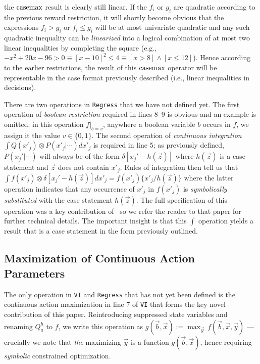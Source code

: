 the $\mathrm{casemax}$ result is clearly still linear.  If the $f_i$ or $g_i$
are quadratic according to the previous reward restriction, it will
shortly become obvious that the expressions $f_i > g_i$ or $f_i \leq
g_i$ will be at most univariate quadratic and any such quadratic
inequality can be \emph{linearized} into a logical combination of at most 
two linear inequalities by completing the square (e.g., 
$-x^2 + 20x - 96 > 0 \equiv [x - 10]^2 \leq 4 \equiv [x > 8] \land [x \leq 12]$).  Hence
according to the earlier restrictions, the result of this $\mathrm{casemax}$
operator will be representable in the case format previously described
(i.e., linear inequalities in decisions).

There are two operations in \texttt{Regress} that we have not defined
yet.  The first operation of \emph{boolean restriction} required in
lines 8--9 is obvious and an example is omitted: in this operation
$f|_{b=v}$, anywhere a boolean variable $b$ occurs in $f$, we assign
it the value $v \in \{ 0,1 \}$.  The second operation of
\emph{continuous integration} $\int Q(x'_j) \otimes P(x'_j|\cdots)
dx'_j$ is required in line 5; as previously defined, $P(x_j'|\cdots)$
will always be of the form $\delta[x_j' - h(\vec{z})]$ where
$h(\vec{z})$ is a case statement and $\vec{z}$ does not contain
$x'_j$.  Rules of integration then tell us that $\int f(x'_j) \otimes
\delta[x_j' - h(\vec{z})] dx'_j = f(x'_j) \{ x'_j / h(\vec{z}) \}$
where the latter operation indicates that any occurrence of $x'_j$ in
$f(x'_j)$ is \emph{symbolically substituted} with the case statement
$h(\vec{z})$.  The full specification of this operation was a key
contribution of~\cite{sanner_uai11} so we refer the reader to that
paper for further technical details.  The
important insight is that this $\int$ operation yields a result that is a
case statement in the form previously outlined.

\subsection{Maximization of Continuous Action Parameters}

The only operation in \texttt{VI} and \texttt{Regress} that has not
yet been defined is the continuous action maximization in line 7 of
\texttt{VI} that forms the key novel contribution of this paper.
Reintroducing suppressed state variables and renaming $Q_a^{h}$ to
$f$, we write this operation as $g(\vec{b},\vec{x}) := \max_{\vec{y}}
\, f(\vec{b},\vec{x},\vec{y})$ --- crucially we note that 
\emph{the} maximizing $\vec{y}$ is a function
$g(\vec{b},\vec{x})$, hence requiring \emph{symbolic} 
constrained optimization.

